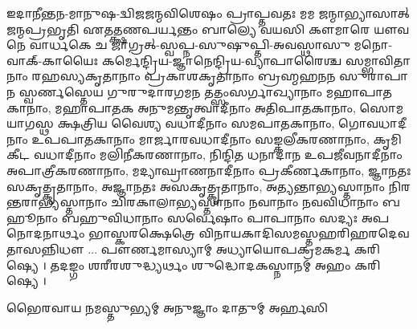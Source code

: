 𑌇𑌦𑌾𑌨𑍀𑌨𑍍𑌤𑌨-𑌮𑌾𑌨𑍁𑌷-𑌦𑍍𑌵𑌿𑌜𑌜𑌨𑍍𑌮𑌵𑌿𑌶𑍇𑌷𑌂 𑌪𑍍𑌰𑌾𑌪𑍍𑌤𑌵𑌤𑌃 𑌮𑌮 𑌜𑌨𑍍𑌮𑌾𑌭𑍍𑌯𑌾𑌸𑌾𑌤𑍍 𑌜𑌨𑍍𑌮𑌪𑍍𑌰𑌭𑍃𑌤𑌿 𑌏𑌤𑌤𑍍𑌕𑍍𑌷𑌣𑌪𑌰𑍍𑌯𑌨𑍍𑌤𑌂 𑌬𑌾𑌲𑍍𑌯𑍇 𑌵𑌯𑌸𑌿
𑌕𑍗𑌮𑌾𑌰𑍇 𑌯𑍗𑌵𑌨𑍇 𑌵𑌾𑌰𑍍𑌧𑌕𑍇 𑌚 𑌜𑌾𑌗𑍍𑌰𑌤𑍍-𑌸𑍍𑌵𑌪𑍍𑌨-𑌸𑍁𑌷𑍁𑌪𑍍𑌤𑌿-𑌅𑌵𑌸𑍍𑌥𑌾𑌸𑍁 𑌮𑌨𑍋-𑌵𑌾𑌕𑍍-𑌕𑌾𑌯𑍈𑌃
𑌕𑌰𑍍𑌮𑍇𑌨𑍍𑌦𑍍𑌰𑌿𑌯-𑌜𑍍𑌞𑌾𑌨𑍇𑌨𑍍𑌦𑍍𑌰𑌿𑌯-𑌵𑍍𑌯𑌾𑌪𑌾𑌰𑍈𑌶𑍍𑌚 𑌸𑌮𑍍𑌭𑌾𑌵𑌿𑌤𑌾𑌨𑌾𑌂 𑌰𑌹𑌸𑍍𑌯𑌕𑍃𑌤𑌾𑌨𑌾𑌂 𑌪𑍍𑌰𑌕𑌾𑌶𑌕𑍃𑌤𑌾𑌨𑌾𑌂 𑌬𑍍𑌰𑌹𑍍𑌮𑌹𑌨𑌨 𑌸𑍁𑌰𑌾𑌪𑌾𑌨
𑌸𑍍𑌵𑌰𑍍𑌣𑌸𑍍𑌤𑍇𑌯 𑌗𑍁𑌰𑍁𑌦𑌾𑌰𑌗𑌮𑌨 𑌤𑌤𑍍𑌸𑌂𑌸𑌰𑍍𑌗𑌾𑌖𑍍𑌯𑌾𑌨𑌾𑌂 𑌮𑌹𑌾𑌪𑌾𑌤𑌕𑌾𑌨𑌾𑌂, 𑌮𑌹𑌾𑌪𑌾𑌤𑌕 𑌅𑌨𑍁𑌮𑌨𑍍𑌤𑍃𑌤𑍍𑌵𑌾𑌦𑍀𑌨𑌾𑌂 𑌅𑌤𑌿𑌪𑌾𑌤𑌕𑌾𑌨𑌾𑌂,
𑌸𑍋𑌮𑌯𑌾𑌗𑌸𑍍𑌥 𑌕𑍍𑌷𑌤𑍍𑌰𑌿𑌯 𑌵𑍈𑌶𑍍𑌯 𑌵𑌧𑌾𑌦𑍀𑌨𑌾𑌂 𑌸𑌮𑌪𑌾𑌤𑌕𑌾𑌨𑌾𑌂, 𑌗𑍋𑌵𑌧𑌾𑌦𑍀𑌨𑌾𑌂 𑌉𑌪𑌪𑌾𑌤𑌕𑌾𑌨𑌾𑌂 𑌮𑌾𑌰𑍍𑌜𑌾𑌰𑌵𑌧𑌾𑌦𑍀𑌨𑌾𑌂 𑌸𑌙𑍍𑌕𑌲𑍀𑌕𑌰𑌣𑌾𑌨𑌾𑌂,
𑌕𑍃𑌮𑌿𑌕𑍀𑌟 𑌵𑌧𑌾𑌦𑍀𑌨𑌾𑌂 𑌮𑌲𑌿𑌨𑍀𑌕𑌰𑌣𑌾𑌨𑌾𑌂, 𑌨𑌿𑌨𑍍𑌦𑌿𑌤 𑌧𑌨𑌾𑌦𑌾𑌨 𑌉𑌪𑌜𑍀𑌵𑌨𑌾𑌦𑍀𑌨𑌾𑌂 𑌅𑌪𑌾𑌤𑍍𑌰𑍀𑌕𑌰𑌣𑌾𑌨𑌾𑌂, 𑌮𑌦𑍍𑌯𑌾𑌘𑍍𑌰𑌾𑌣𑌨𑌾𑌦𑍀𑌨𑌾𑌂
𑌪𑍍𑌰𑌕𑍀𑌰𑍍𑌣𑌕𑌾𑌨𑌾𑌂, 𑌜𑍍𑌞𑌾𑌨𑌤𑌃 𑌸𑌕𑍃𑌤𑍍𑌕𑍃𑌤𑌾𑌨𑌾𑌂, 𑌅𑌜𑍍𑌞𑌾𑌨𑌤𑌃 𑌅𑌸𑌕𑍃𑌤𑍍𑌕𑍃𑌤𑌾𑌨𑌾𑌂, 𑌅𑌤𑍍𑌯𑌨𑍍𑌤𑌾𑌭𑍍𑌯𑌸𑍍𑌤𑌾𑌨𑌾𑌂 𑌨𑌿𑌰𑌨𑍍𑌤𑌰𑌾𑌭𑍍𑌯𑌸𑍍𑌤𑌾𑌨𑌾𑌂
𑌚𑌿𑌰𑌕𑌾𑌲𑌾𑌭𑍍𑌯𑌸𑍍𑌤𑌾𑌨𑌾𑌂 𑌨𑌵𑌾𑌨𑌾𑌂 𑌨𑌵𑌵𑌿𑌧𑌾𑌨𑌾𑌂 𑌬𑌹𑍂𑌨𑌾𑌂 𑌬𑌹𑍁𑌵𑌿𑌧𑌾𑌨𑌾𑌂 𑌸𑌰𑍍𑌵𑍇𑌷𑌾𑌂 𑌪𑌾𑌪𑌾𑌨𑌾𑌂 𑌸𑌦𑍍𑌯𑌃 𑌅𑌪𑌨𑍋𑌦𑌨𑌾𑌰𑍍𑌥𑌂
𑌭𑌾𑌸𑍍𑌕𑌰𑌕𑍍𑌷𑍇𑌤𑍍𑌰𑍇  𑌵𑌿𑌨𑌾𑌯𑌕𑌾𑌦𑌿𑌸𑌮𑌸𑍍𑌤𑌹𑌰𑌿𑌹𑌰𑌦𑍇𑌵𑌤𑌾𑌸𑌨𑍍𑌨𑌿𑌧𑍗 ... 𑌪𑍗𑌰𑍍𑌣𑌮𑌾𑌸𑍍𑌯𑌾𑌮𑍍 𑌅𑌧𑍍𑌯𑌾𑌯𑍋𑌪𑌕𑍍𑌰𑌮𑌕𑌰𑍍𑌮 𑌕𑌰𑌿𑌷𑍍𑌯𑍇 ।  𑌤𑌦𑌙𑍍𑌗𑌂
𑌶𑌰𑍀𑌰𑌶𑍁𑌦𑍍𑌧𑍍𑌯𑌰𑍍𑌥𑌂 𑌶𑍁𑌦𑍍𑌧𑍋𑌦𑌕𑌸𑍍𑌨𑌾𑌨𑌮𑍍 𑌅𑌹𑌂 𑌕𑌰𑌿𑌷𑍍𑌯𑍇 ।
    
     {𑌭𑍈𑌰𑌵𑌾𑌯 𑌨𑌮𑌸𑍍𑌤𑍁𑌭𑍍𑌯𑌮𑍍 𑌅𑌨𑍁𑌜𑍍𑌞𑌾𑌂 𑌦𑌾𑌤𑍁𑌮𑍍 𑌅𑌰𑍍𑌹𑌸𑌿}

    




